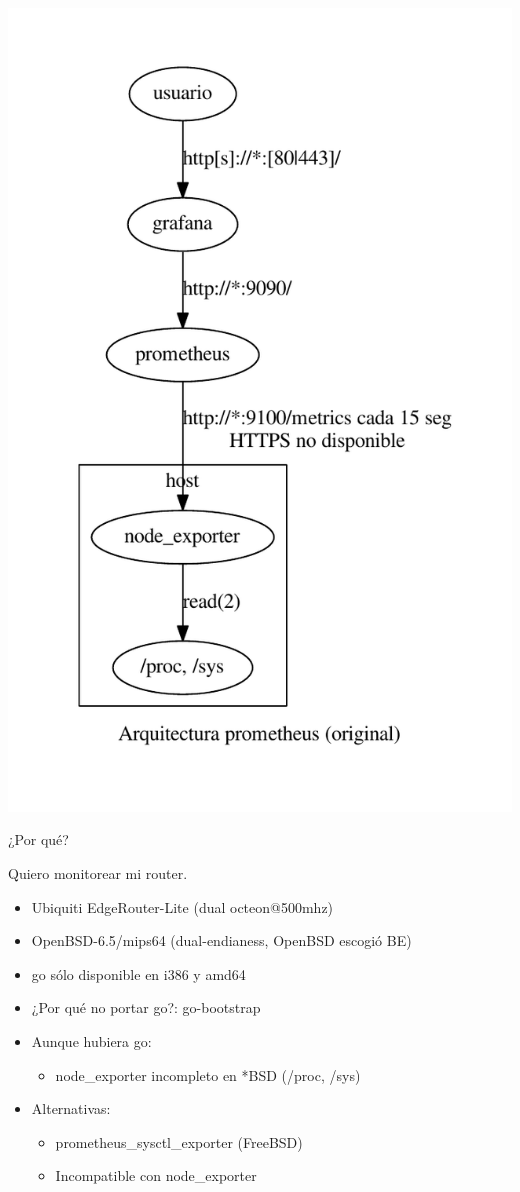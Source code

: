\documentclass[11pt,spanish]{article}
\newcommand{\rowsp}[1][1em]{\vspace{#1}}
\newcommand{\hone}[1]{{\rowsp[0.3em]\noindent\Large #1 \rowsp[0.3em]}}
\newcommand{\myitm}[1]{\begin{itemize}#1\end{itemize}}
\begin{document}
\newpage %
\begin{center}
	\includegraphics[keepaspectratio=true,width=\textwidth,height=\textheight]{img/pronodebsd/arq}
\end{center}

\newpage %
\hone{¿Por qué?}

Quiero monitorear mi router.
\myitm{
	\item Ubiquiti EdgeRouter-Lite (dual octeon@500mhz)
	\item OpenBSD-6.5/mips64 (dual-endianess, OpenBSD escogió BE)
	\item go sólo disponible en i386 y amd64
	\item ¿Por qué no portar go?: go-bootstrap
	\item Aunque hubiera go:
		\myitm{
			\item node\_exporter incompleto en *BSD (/proc, /sys)
		}
	\item Alternativas:
		\myitm{
		\item prometheus\_sysctl\_exporter (FreeBSD)
		\item Incompatible con node\_exporter
		}
}
\end{document}
